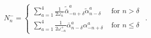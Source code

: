 \begin{equation}
N^-_n = \left\{  \begin{array}{ll} 
\sum_{a=1}^4 \frac{1}{2\omega^-_{n}} 
\tilde{\bar{\alpha}}_{-n+\delta}^a \tilde{\alpha}_{n-\delta}^a   
& \mbox{ for } n > \delta \\
\sum_{a=1}^4 \frac{1}{2\omega^+_{-n}} 
\bar{\alpha}_{n-\delta}^a \alpha_{-n+\delta}^a 
& \mbox{ for } n \leq \delta
\end{array} \right. \ \ .
\end{equation}


